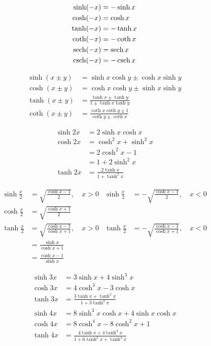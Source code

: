 \begin{align*}
  \sinh(-x) &= -\sinh x \\
  \cosh(-x) &= \cosh x \\
  \tanh(-x) &= -\tanh x \\
  \coth(-x) &= -\coth x \\
  \sech(-x) &= \sech x \\
  \csch(-x) &= -\csch x \\
\end{align*}

\begin{align*}
  \sinh(x\pm y)&=\sinh x \cosh y \pm \cosh x \sinh y \\
  \cosh(x\pm y)&=\cosh x \cosh y \pm \sinh x \sinh y \\
  \tanh(x\pm y)&=\frac{\tanh x\pm \tanh y}{1\pm \tanh x\tanh y} \\
  \coth(x\pm y)&=\frac{\coth x\coth y \pm 1}{\coth y \pm \coth x}
\end{align*}

\begin{align*}
  \sinh 2x &= 2\sinh x\cosh x \\
  \cosh 2x &= \cosh^{2}x+\sinh^{2}x \\
           &= 2\cosh^{2}x -1 \\
           &= 1+2\sinh^{2}x \\
  \tanh 2x &= \frac{2\tanh x}{1+\tanh^{2}x}
\end{align*}

\begin{align*}
  \sinh \frac{x}{2} &= \sqrt{\frac{\cosh x -1}{2}},\quad x>0 & \sinh \frac{x}{2} &= -\sqrt{\frac{\cosh x -1}{2}},\quad x<0 \\
  \cosh \frac{x}{2} &= \sqrt{\frac{\cosh x+1}{2}} \\
  \tanh \frac{x}{2} &= \sqrt{\frac{\cosh x - 1 }{\cosh x + 1}},\quad x>0 & \tanh \frac{x}{2} &= -\sqrt{\frac{\cosh x - 1 }{\cosh x + 1}},\quad x<0 \\
  &=\frac{\sinh x}{\cosh x+1} \\
  &=\frac{\cosh x -1}{\sinh x}
\end{align*}


\begin{align*}
  \sinh 3x &= 3\sinh x + 4\sinh^{3}x \\
  \cosh 3x &= 4\cosh^{3}x-3\cosh x \\
  \tanh 3x &= \frac{3\tanh x + \tanh^{3}x}{1+3\tanh^{2}x} \\
  \sinh 4x &= 8\sinh^{3}x\cosh x + 4\sinh x \cosh x \\
  \cosh 4x &= 8\cosh^{4}x-8\cosh^{2}x+1 \\
  \tanh 4x &= \frac{4\tanh x + 4\tanh^{3}x}{1+6\tanh^{2}x+\tanh^{4}x}
\end{align*}


